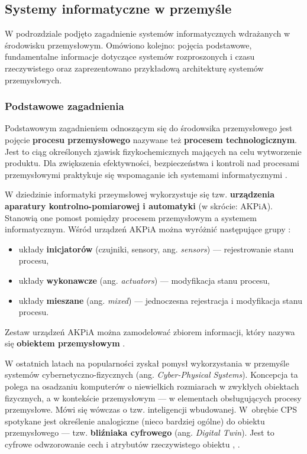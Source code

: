 \documentclass[a4paper, 12pt, twoside]{article}
\begin{document}
\subsection{Systemy informatyczne w przemyśle} \label{isp}

W podrozdziale podjęto zagadnienie systemów informatycznych wdrażanych w środowisku przemysłowym.
Omówiono kolejno: pojęcia podstawowe, fundamentalne informacje dotyczące systemów rozproszonych i czasu rzeczywistego
oraz zaprezentowano przykładową architekturę systemów przemysłowych.

\subsubsection{Podstawowe zagadnienia}

Podstawowym zagadnieniem odnoszącym się do środowsika przemysłowego jest pojęcie
\textbf{procesu przemysłowego} nazywane też \textbf{procesem technologicznym}.
Jest to ciąg określonych zjawisk fizykochemicznych mających na celu wytworzenie
produktu. Dla zwiększenia efektywności, bezpieczeństwa i kontroli nad procesami
przemysłowymi praktykuje się wspomaganie ich systemami informatycznymi \cite{isp}.

W dziedzinie informatyki przeymsłowej wykorzystuje się tzw.
\textbf{urządzenia aparatury kontrolno-pomiarowej i automatyki} (w skrócie: AKPiA).
Stanowią one pomost pomiędzy procesem przemysłowym a systemem informatycznym.
Wśród urządzeń AKPiA można wyróżnić następujące grupy \cite{isp}:
\begin{itemize}
      \itemsep0em
      \item układy \textbf{inicjatorów} (czujniki, sensory, ang. \emph{sensors}) --- rejestrowanie stanu procesu,
      \item układy \textbf{wykonawcze} (ang. \emph{actuators}) --- modyfikacja stanu procesu,
      \item układy \textbf{mieszane} (ang. \emph{mixed}) --- jednoczesna rejestracja i modyfikacja stanu procesu.
\end{itemize}

\noindent Zestaw urządzeń AKPiA można zamodelować zbiorem informacji, który nazywa się
\textbf{obiektem przemysłowym} \cite{isp}.

W ostatnich latach na popularności zyskał pomysł wykorzystania
w przemyśle systemów cybernetyczno-fizycznych
(ang. \emph{Cyber-Physical Systems}). Koncepcja ta polega na osadzaniu
komputerów o niewielkich rozmiarach w zwykłych obiektach fizycznych, a w kontekście
przemysłowym --- w elementach obsługujących procesy przemysłowe. Mówi się
wówczas o tzw. inteligencji wbudowanej. W~obrębie
CPS spotykane jest określenie analogiczne (nieco bardziej ogólne) do obiektu przemysłowego ---
tzw. \textbf{bliźniaka cyfrowego} (ang. \emph{Digital Twin}). Jest to
cyfrowe odwzorowanie cech i atrybutów rzeczywistego obiektu \cite{isp}, \cite{iiot-challenges-opportunities-directions}.
\end{document}
